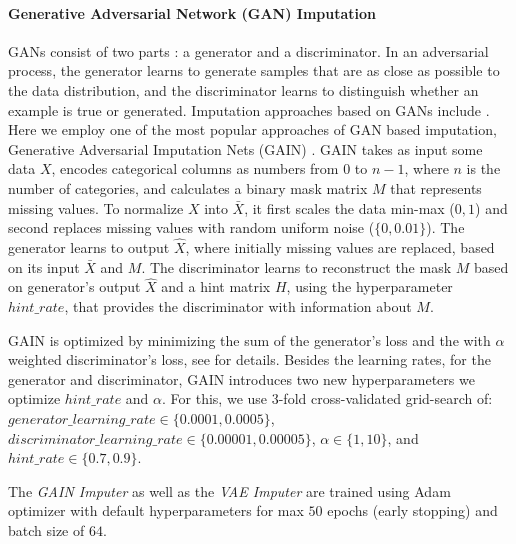 \paragraph{Generative Adversarial Network (GAN) Imputation}
GANs consist of two parts \citep{GAN}: a generator and a discriminator. In an adversarial process, the generator learns to generate samples that are as close as possible to the data distribution, and the discriminator learns to distinguish whether an example is true or generated. Imputation approaches based on GANs include \citep{GAIN, VIGAN, MisGAN}. 
Here we employ one of the most popular approaches of GAN based imputation, Generative Adversarial Imputation Nets (GAIN) \cite{GAIN}.  GAIN takes as input some data $X$, encodes categorical columns as numbers from $0$ to $n-1$, where $n$ is the number of categories, and calculates a binary mask matrix $M$ that represents missing values. To normalize $X$ into $\bar{X}$, it first scales the data min-max ($0, 1$) and second replaces missing values with random uniform noise ($\{0, 0.01\}$). The generator learns to output $\hat{X}$, where initially missing values are replaced, based on its input $\bar{X}$ and $M$. The discriminator learns to reconstruct the mask $M$ based on generator's output $\hat{X}$ and a hint matrix $H$, using the hyperparameter $hint\_rate$, that provides the discriminator with information about $M$.

GAIN is optimized by minimizing the sum of the generator's loss and the with $\alpha$ weighted discriminator's loss, see \cite{GAIN} for details. Besides the learning rates, for the generator and discriminator, GAIN introduces two new hyperparameters we optimize $hint\_rate$ and $\alpha$. For this, we use 3-fold cross-validated grid-search of: $generator\_learning\_rate \in \{0.0001, 0.0005\}$, $discriminator\_learning\_rate \in \{0.00001, 0.00005\}$, $\alpha \in \{1, 10\}$, and $hint\_rate \in \{0.7, 0.9\}$.


The \emph{GAIN Imputer} as well as the \emph{VAE Imputer} are trained using Adam optimizer with default hyperparameters for max $50$ epochs (early stopping) and batch size of $64$.



